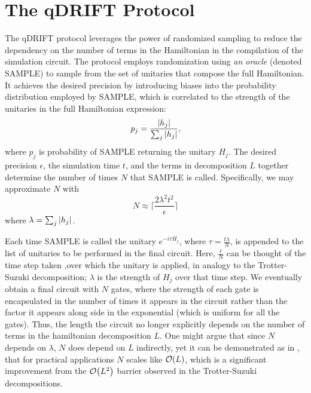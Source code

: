 \documentclass[letterpaper, 11pt]{article}
\begin{document}
\section*{The qDRIFT Protocol}
The qDRIFT protocol leverages the power of randomized sampling to reduce the dependency on the number of terms in the Hamiltonian in the compilation of the simulation circuit. The protocol employs randomization using \textit{an oracle} (denoted SAMPLE) to sample from the set of unitaries that compose the full Hamiltonian. It achieves the desired precision by introducing biases into the probability distribution employed by SAMPLE, which is correlated to the strength of the unitaries in the full Hamiltonian expression:
\begin{equation}
    p_j = \frac{\abs{h_j}}{\sum_j \abs{h_j}},
\end{equation}
where $p_j$ is probability of SAMPLE returning the unitary $H_j$. The desired precision $\epsilon$, the simulation time $t$, and the terms in decomposition $L$ together determine the number of times $N$ that SAMPLE is called. Specifically, we may approximate $N$ with
\begin{equation}
    N \approx \Big\lceil \frac{2 \lambda^2 t^2}{\epsilon}\Big\rceil
\end{equation}
where $\lambda = \sum_j \abs{h_j}$. \smallskip

Each time SAMPLE is called the unitary $e^{-i \tau H_j}$, where $\tau = \frac{t \lambda}{N}$, is appended to the list of unitaries to be performed in the final circuit. Here, $\frac{t}{N}$ can be thought of the time step taken ,over which the unitary is applied, in analogy to the Trotter-Suzuki decomposition; $\lambda$ is the strength of $H_j$ over that time step. We eventually obtain a final circuit with $N$ gates, where the strength of each gate is encapsulated in the number of times it appears in the circuit rather than the factor it appears along side in the exponential (which is uniform for all the gates). Thus, the length the circuit no longer explicitly depends on the number of terms in the hamiltonian decomposition $L$. One might argue that since $N$ depends on $\lambda$, $N$ does depend on $L$ indirectly, yet it can be demonstrated as in \cite{PhysRevLett.123.070503}, that for practical applications $N$ scales like $\order{L}$, which is a significant improvement from the $\order{L^2}$ barrier observed in the Trotter-Suzuki decompositions. 
\end{document}
